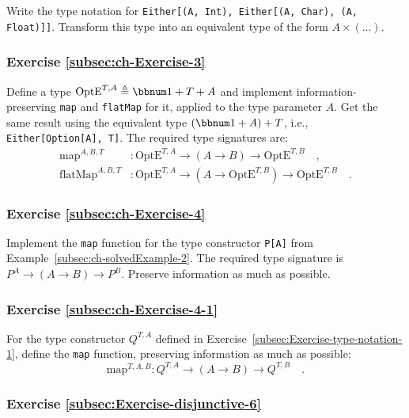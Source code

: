 Write the type notation for \lstinline!Either[(A, Int), Either[(A, Char), (A, Float)]]!.
Transform this type into an equivalent type of the form $A\times(...)$.

\subsubsection{Exercise \label{subsec:ch-Exercise-3}\ref{subsec:ch-Exercise-3}}

Define a type $\text{OptE}^{T,A}\triangleq\bbnum 1+T+A$ and implement
information-preserving \lstinline!map! and \lstinline!flatMap! for
it, applied to the type parameter $A$. Get the same result using
the equivalent type $(\bbnum 1+A)+T$, i.e., \lstinline!Either[Option[A], T]!.
The required type signatures are:
\begin{align*}
\text{map}^{A,B,T} & :\text{OptE}^{T,A}\rightarrow\left(A\rightarrow B\right)\rightarrow\text{OptE}^{T,B}\quad,\\
\text{flatMap}^{A,B,T} & :\text{OptE}^{T,A}\rightarrow(A\rightarrow\text{OptE}^{T,B})\rightarrow\text{OptE}^{T,B}\quad.
\end{align*}


\subsubsection{Exercise \label{subsec:ch-Exercise-4}\ref{subsec:ch-Exercise-4}}

Implement the \lstinline!map! function for the type constructor \lstinline!P[A]!
from Example~\ref{subsec:ch-solvedExample-2}. The required type
signature is $P^{A}\rightarrow\left(A\rightarrow B\right)\rightarrow P^{B}$.
Preserve information as much as possible.

\subsubsection{Exercise \label{subsec:ch-Exercise-4-1}\ref{subsec:ch-Exercise-4-1}}

For the type constructor $Q^{T,A}$ defined in Exercise~\ref{subsec:Exercise-type-notation-1},
define the \lstinline!map! function, preserving information as much
as possible:
\[
\text{map}^{T,A,B}:Q^{T,A}\rightarrow\left(A\rightarrow B\right)\rightarrow Q^{T,B}\quad.
\]


\subsubsection{Exercise \label{subsec:Exercise-disjunctive-6}\ref{subsec:Exercise-disjunctive-6}}

